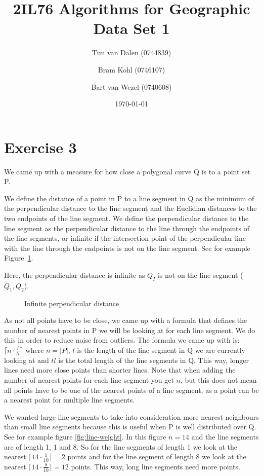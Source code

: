 \documentclass[a4paper,11pt]{article}
\title{
	2IL76 Algorithms for Geographic Data Set 1 \\
}
\author{
	Tim van Dalen (0744839)
	\and
	Bram Kohl (0746107)
	\and
	Bart van Wezel (0740608)
}
\date{\today}
\begin{document}
	\maketitle
	
\section*{Exercise 3}
We came up with a measure for how close a polygonal curve Q is to a point set P.

We define the distance of a point in P to a line segment in Q as the minimum of the perpendicular distance to the line segment and the Euclidian distances to the two endpoints of the line segment.
We define the perpendicular distance to the line segment as the perpendicular distance to the line through the endpoints of the line segments, or infinite if the intersection point of the perpendicular line with the line through the endpoints is not on the line segment.
See for example Figure~\ref{fig:perp-distance}.

Here, the perpendicular distance is infinite as $Q_I$ is not on the line segment ($Q_1,Q_2$).

\begin{figure}[H]
	\centering
	\def\svgwidth{0.5\textwidth}
	
	\caption{Infinite perpendicular distance}
	\label{fig:perp-distance}
\end{figure}

As not all points have to be close, we came up with a formula that defines the number of nearest points in P we will be looking at for each line segment.
We do this in order to reduce noise from outliers.
The formula we came up with is: $\lceil n\cdot \frac{l}{tl}\rceil$ where $n = |P|$, $l$ is the length of the line segment in Q we are currently looking at and $tl$ is the total length of the line segments in Q.
This way, longer lines need more close points than shorter lines.
Note that when adding the number of nearest points for each line segment you get $n$, but this does not mean all points have to be one of the nearest points of a line segment, as a point can be a nearest point for multiple line segments.

We wanted large line segments to take into consideration more nearest neighbours than small line segments because this is useful when P is well distributed over Q.
See for example figure \ref{fig:line-weight}. In this figure $n = 14$ and the line segments are of length 1, 1 and 8. So for the line segments of length 1 we look at the nearest $\lceil 14\cdot \frac{1}{10}\rceil = 2$ points and for the line segment of length 8 we look at the nearest $\lceil 14\cdot \frac{8}{10}\rceil = 12$ points. This way, long line segments need more points.
\end{document}

